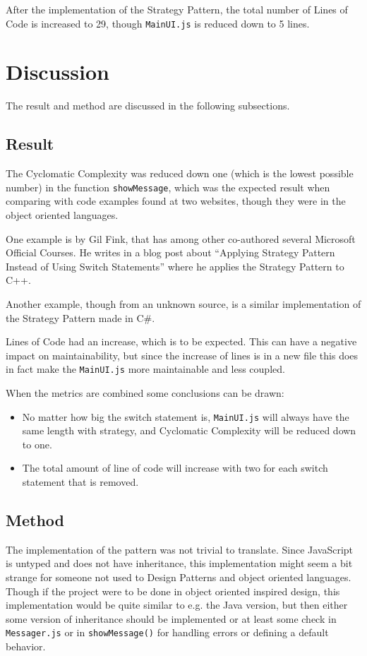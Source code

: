 \documentclass[conference, a4paper]{IEEEtran}
\begin{document}
After the implementation of the Strategy Pattern, the total number of Lines of Code is increased to 29, though \texttt{MainUI.js} is reduced down to 5 lines.

\section{Discussion}
The result and method are discussed in the following subsections.

\subsection{Result}
The Cyclomatic Complexity was reduced down one (which is the lowest possible number) in the function \texttt{showMessage}, which was the expected result when comparing with code examples found at two websites, though they were in the object oriented languages.

One example is by Gil Fink, that has among other co-authored several Microsoft Official Courses. He writes in a blog post about ``Applying Strategy Pattern Instead of Using Switch Statements'' where he applies the Strategy Pattern to C++.~\cite{bibitem:GilFink}

Another example, though from an unknown source, is a similar implementation of the Strategy Pattern made in C\#.~\cite{bibitem:CSharp}

Lines of Code had an increase, which is to be expected. This can have a negative impact on maintainability, but since the increase of lines is in a new file this does in fact make the \texttt{MainUI.js} more maintainable and less coupled.

When the metrics are combined some conclusions can be drawn:
\begin{itemize}
	\item No matter how big the switch statement is, \texttt{MainUI.js} will always have the same length with strategy, and Cyclomatic Complexity will be reduced down to one.
	\item The total amount of line of code will increase with two for each switch statement that is removed.
\end{itemize}

\subsection{Method}
The implementation of the pattern was not trivial to translate. Since JavaScript is untyped and does not have inheritance, this implementation might seem a bit strange for someone not used to Design Patterns and object oriented languages. Though if the project were to be done in object oriented inspired design, this implementation would be quite similar to e.g. the Java version, but then either some version of inheritance should be implemented or at least some check in \texttt{Messager.js} or in \texttt{showMessage()} for handling errors or defining a default behavior.
\end{document}
